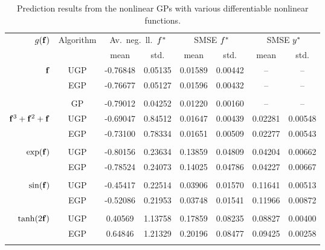 \documentclass{article} %
\begin{document}
\begin{table}[tb]
    \centering
    \small
    \caption[]{Prediction results from the nonlinear GPs with various 
        differentiable nonlinear functions.}
    \begin{tabular}{r|c| c c c c c c}
        \multirow{2}{*}{$g\!\left({{\mathbf{f}}}\right)$} & \multirow{2}{*}{Algorithm} & 
            \multicolumn{2}{c}{Av.\ neg.\ ll.\ $f^{*}$} &
            \multicolumn{2}{c}{SMSE $f^{*}$} &
            \multicolumn{2}{c}{SMSE $y^{*}$} \\
        & & mean & std. & mean & std. & mean & std.\\
        \toprule
        $\mathbf{f}$ 
& UGP & -0.76848 & 0.05135 & 0.01589 & 0.00442 & -- & -- \\
& EGP & -0.76677 & 0.05127 & 0.01596 & 0.00432 & -- & -- \\
& \cite{Opper2009} \\
& GP & -0.79012 & 0.04252 & 0.01220 & 0.00160 & -- & -- \\
        \midrule
        $\mathbf{f}^3 + \mathbf{f}^2 + \mathbf{f}$ 
& UGP & -0.69047 & 0.84512 & 0.01647 & 0.00439 & 0.02281 & 0.00548 \\
& EGP & -0.73100 & 0.78334 & 0.01651 & 0.00509 & 0.02277 & 0.00543 \\
            & \cite{Opper2009} \\
        \midrule
        $\exp\!\left({\mathbf{f}}\right)$ 
& UGP & -0.80156 & 0.23634 & 0.13859 & 0.04809 & 0.04204 & 0.00662 \\
& EGP & -0.78524 & 0.24073 & 0.14025 & 0.04786 & 0.04227 & 0.00667 \\
            & \cite{Opper2009} \\
        \midrule
        $\sin\!\left({\mathbf{f}}\right)$ 
& UGP & -0.45417 & 0.22514 & 0.03906 & 0.01570 & 0.11641 & 0.00513 \\
& EGP & -0.52086 & 0.21953 & 0.03748 & 0.01541 & 0.11966 & 0.00872 \\
            & \cite{Opper2009} \\
        \midrule
        $\tanh\!\left({2\mathbf{f}}\right)$
& UGP & 0.40569 & 1.13758 & 0.17859 & 0.08235 & 0.08827 & 0.00400 \\
& EGP & 0.64846 & 1.21329 & 0.20196 & 0.08477 & 0.09425 & 0.00258 \\
            & \cite{Opper2009} \\
        \bottomrule
    \end{tabular}
    \label{tab:toy}
\end{table}
\end{document}
